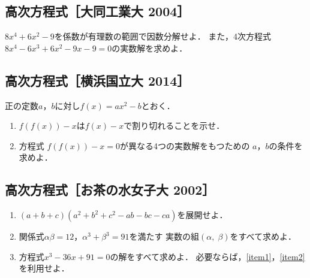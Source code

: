 \documentclass[../../ms_q.tex]{subfiles}
\begin{document}
\vspace{2cm}
\vfill

\subsection{高次方程式［大同工業大 2004］}

$8x^4+6x^2-9$を係数が有理数の範囲で因数分解せよ．
また，4次方程式$8x^4-6x^3+6x^2-9x-9=0$の実数解を求めよ．

\vspace{2cm}
\vfill

\subsection{高次方程式［横浜国立大 2014］}

正の定数$a$，$b$に対し$f(x)=ax^2-b$とおく．

\begin{enumerate}

    \item $f\left(f(x)\right)-x$は$f(x)-x$で割り切れることを示せ．

    \item 方程式 $f\left(f(x)\right)-x=0$が異なる4つの実数解をもつための
        $a$，$b$の条件を求めよ．

\end{enumerate}

\vspace{2cm}
\vfill

\subsection{高次方程式［お茶の水女子大 2002］}

\begin{enumerate}

    \item $(a+b+c)(a^2+b^2+c^2-ab-bc-ca)$を展開せよ．
        \label{item1}

    \item 関係式$\alpha\beta=12$，$\alpha^3+\beta^3=91$を満たす
        実数の組$(\alpha,\; \beta)$をすべて求めよ．
        \label{item2}

    \item 方程式$x^3-36x+91=0$の解をすべて求めよ．
        必要ならば，\!\!\ref{item1}\!\!\!\!，\!\!\!\ref{item2}\!\!\!を利用せよ．

\end{enumerate}

\vspace{2cm}
\vfill
\end{document}

